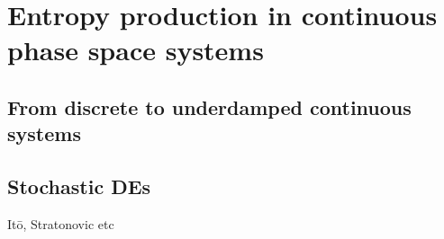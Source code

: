 \chapter{Entropy production in continuous phase space systems}

\section{From discrete to underdamped continuous systems}

\section{Stochastic DEs}

It\=o, Stratonovic etc